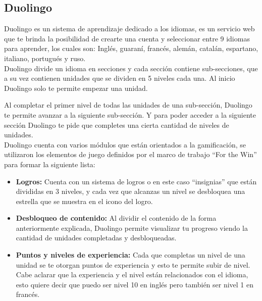     
\begin{multicols}{2}    
\subsection*{Duolingo}
    
Duolingo es un sistema de aprendizaje dedicado a los idiomas, es un servicio web que
te brinda la posibilidad de crearte una cuenta y seleccionar entre 9 idiomas para aprender,
los cuales son: Inglés, guaraní, francés, alemán, catalán, espartano, italiano, portugués y ruso.\\

\noindent Duolingo divide un idioma en secciones y cada sección contiene sub-secciones,
que a su vez contienen unidades que se dividen en 5 niveles cada una. Al inicio Duolingo
solo te permite empezar una unidad.
    
\noindent Al completar el primer nivel de todas las unidades de una sub-sección,
Duolingo te permite avanzar a la siguiente sub-sección. Y para poder acceder a la siguiente
sección Duolingo te pide que completes una cierta cantidad de niveles de unidades.\\
    
    \noindent Duolingo cuenta con varios módulos que están orientados a la gamificación, se utilizaron
    los elementos de juego definidos por el marco de trabajo ``For the Win'' para formar la siguiente lista:
    
    \begin{itemize}
        \item {\bf Logros:} Cuenta con un sistema de logros o en este caso ``insignias''
            que están divididas en 3 niveles, y cada vez que alcanzas un nivel se 
            desbloquea una estrella que se muestra en el icono del logro.
            
        \item {\bf Desbloqueo de contenido:} Al dividir el contenido de la forma
            anteriormente explicada, Duolingo permite visualizar tu progreso viendo
            la cantidad de unidades completadas y desbloqueadas.
            
        \item {\bf Puntos y niveles de experiencia:} Cada que completas un nivel de una
        unidad se te otorgan puntos de experiencia y esto te permite subir de nivel.
        Cabe aclarar que la experiencia y el nivel están relacionados con el idioma,
        esto quiere decir que puedo ser nivel 10 en inglés pero también ser nivel 1 en francés.
        

\end{itemize}
\end{multicols}
